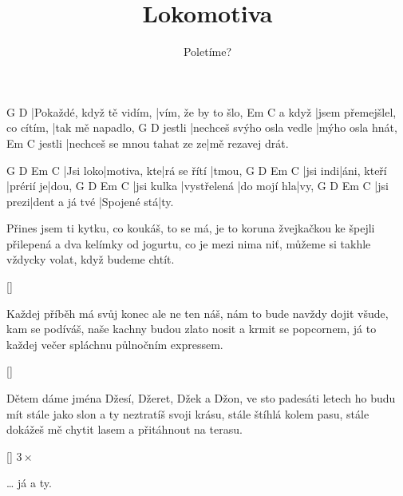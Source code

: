 \documentclass{song}
\title{Lokomotiva}
\author{Poletíme?}
\begin{document}
\strophe
G                        D
|Pokaždé, když tě vidím, |vím, že by to šlo,
       Em                          C
a když |jsem přemejšlel, co cítím, |tak mě napadlo,
       G                         D
jestli |nechceš svýho osla vedle |mýho osla hnát,
       Em                          C
jestli |nechceš se mnou tahat ze ze|mě rezavej drát. 
\endstrophe

G        D           Em          C
|Jsi loko|motiva, kte|rá se řítí |tmou,
G        D           Em        C
|jsi indi|áni, kteří |prérií je|dou,
G          D           Em          C
|jsi kulka |vystřelená |do mojí hla|vy,
G         D              Em          C
|jsi prezi|dent a já tvé |Spojené stá|ty.
\endstrophe

\strophe*
Přines jsem ti kytku, co koukáš, to se má,
je to koruna žvejkačkou ke špejli přilepená
a dva kelímky od jogurtu, co je mezi nima niť,
můžeme si takhle vždycky volat, když budeme chtít.
\endstrophe

\ref{}

\strophe*
Každej příběh má svůj konec ale ne ten náš,
nám to bude navždy dojit všude, kam se podíváš,
naše kachny budou zlato nosit a krmit se popcornem,
já to každej večer spláchnu půlnočním expressem.
\endstrophe

\ref{}

\strophe*
Dětem dáme jména Džesí, Džeret, Džek a Džon,
ve sto padesáti letech ho budu mít stále jako slon
a ty neztratíš svoji krásu, stále štíhlá kolem pasu,
stále dokážeš mě chytit lasem a přitáhnout na terasu.
\endstrophe

\ref{} $3\times$

\strophe*
\ldots{} já a ty.
\endstrophe
\end{document}

